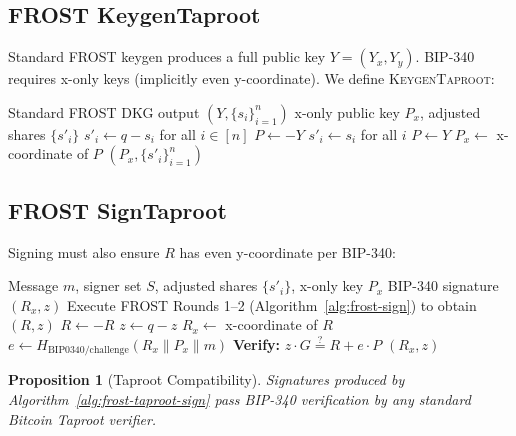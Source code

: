 \documentclass[11pt,twocolumn]{article}
\newtheorem{proposition}[theorem]{Proposition}
\begin{document}
\subsection{FROST KeygenTaproot}

Standard FROST keygen produces a full public key $Y = (Y_x, Y_y)$. BIP-340 requires
x-only keys (implicitly even y-coordinate). We define \textsc{KeygenTaproot}:

\begin{algorithm}[H]
\caption{FROST KeygenTaproot}
\label{alg:frost-taproot-keygen}
\begin{algorithmic}[1]
\Require Standard FROST DKG output $(Y, \{s_i\}_{i=1}^n)$
\Ensure x-only public key $P_x$, adjusted shares $\{s'_i\}$
  \State $s'_i \gets q - s_i$ for all $i \in [n]$ 
  \State $P \gets -Y$ 
\Else
  \State $s'_i \gets s_i$ for all $i$
  \State $P \gets Y$
\EndIf
\State $P_x \gets$ x-coordinate of $P$ 
\State \Return $(P_x, \{s'_i\}_{i=1}^n)$
\end{algorithmic}
\end{algorithm}

\subsection{FROST SignTaproot}

Signing must also ensure $R$ has even y-coordinate per BIP-340:

\begin{algorithm}[H]
\caption{FROST SignTaproot}
\label{alg:frost-taproot-sign}
\begin{algorithmic}[1]
\Require Message $m$, signer set $S$, adjusted shares $\{s'_i\}$, x-only key $P_x$
\Ensure BIP-340 signature $(R_x, z)$
\State Execute FROST Rounds 1--2 (Algorithm~\ref{alg:frost-sign}) to obtain $(R, z)$
  \State $R \gets -R$
  \State $z \gets q - z$ 
\EndIf
\State $R_x \gets$ x-coordinate of $R$
\State $e \gets H_{\text{BIP0340/challenge}}(R_x \| P_x \| m)$
\State \textbf{Verify:} $z \cdot G \stackrel{?}{=} R + e \cdot P$
\State \Return $(R_x, z)$ 
\end{algorithmic}
\end{algorithm}

\begin{proposition}[Taproot Compatibility]
\label{prop:taproot}
Signatures produced by Algorithm~\ref{alg:frost-taproot-sign} pass BIP-340 verification
by any standard Bitcoin Taproot verifier.
\end{proposition}
\end{document}
